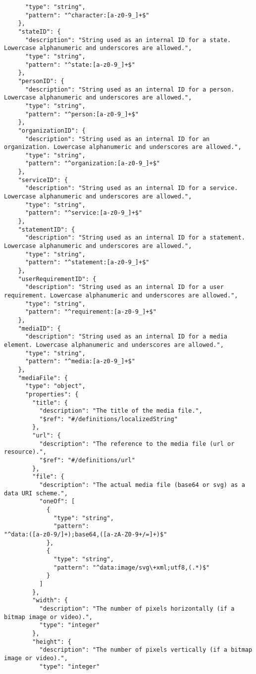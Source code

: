 \documentclass[10pt,letterpaper]{article}
\begin{document}
\begin{verbatim}
      "type": "string",
      "pattern": "^character:[a-z0-9_]+$"
    },
    "stateID": {
      "description": "String used as an internal ID for a state.
Lowercase alphanumeric and underscores are allowed.",
      "type": "string",
      "pattern": "^state:[a-z0-9_]+$"
    },
    "personID": {
      "description": "String used as an internal ID for a person.
Lowercase alphanumeric and underscores are allowed.",
      "type": "string",
      "pattern": "^person:[a-z0-9_]+$"
    },
    "organizationID": {
      "description": "String used as an internal ID for an
organization. Lowercase alphanumeric and underscores are allowed.",
      "type": "string",
      "pattern": "^organization:[a-z0-9_]+$"
    },
    "serviceID": {
      "description": "String used as an internal ID for a service.
Lowercase alphanumeric and underscores are allowed.",
      "type": "string",
      "pattern": "^service:[a-z0-9_]+$"
    },
    "statementID": {
      "description": "String used as an internal ID for a statement.
Lowercase alphanumeric and underscores are allowed.",
      "type": "string",
      "pattern": "^statement:[a-z0-9_]+$"
    },
    "userRequirementID": {
      "description": "String used as an internal ID for a user
requirement. Lowercase alphanumeric and underscores are allowed.",
      "type": "string",
      "pattern": "^requirement:[a-z0-9_]+$"
    },
    "mediaID": {
      "description": "String used as an internal ID for a media
element. Lowercase alphanumeric and underscores are allowed.",
      "type": "string",
      "pattern": "^media:[a-z0-9_]+$"
    },
    "mediaFile": {
      "type": "object",
      "properties": {
        "title": {
          "description": "The title of the media file.",
          "$ref": "#/definitions/localizedString"
        },
        "url": {
          "description": "The reference to the media file (url or
resource).",
          "$ref": "#/definitions/url"
        },
        "file": {
          "description": "The actual media file (base64 or svg) as a
data URI scheme.",
          "oneOf": [
            {
              "type": "string",
              "pattern":
"^data:([a-z0-9/]+);base64,([a-zA-Z0-9+/=]+)$"
            },
            {
              "type": "string",
              "pattern": "^data:image/svg\+xml;utf8,(.*)$"
            }
          ]
        },
        "width": {
          "description": "The number of pixels horizontally (if a
bitmap image or video).",
          "type": "integer"
        },
        "height": {
          "description": "The number of pixels vertically (if a bitmap
image or video).",
          "type": "integer"

\end{verbatim}
\end{document}
